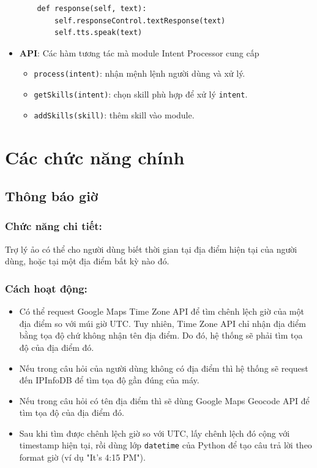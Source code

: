 \begin{itemize}
\begin{lstlisting}
    def response(self, text):
        self.responseControl.textResponse(text)
        self.tts.speak(text)
\end{lstlisting}
\item \textbf{API}: Các hàm tương tác mà module Intent Processor cung cấp
\begin{itemize}
\item \lstinline{process(intent)}: nhận mệnh lệnh người dùng và xử lý.
\item \lstinline{getSkills(intent)}: chọn skill phù hợp để xử lý \lstinline{intent}.
\item \lstinline{addSkills(skill)}: thêm skill vào module.
\end{itemize}
\end{itemize}

\section{Các chức năng chính}

\subsection{Thông báo giờ}

\subsubsection{Chức năng chi tiết:}

Trợ lý ảo có thể cho người dùng biết thời gian tại địa điểm hiện tại của người dùng, hoặc tại một địa điểm bất kỳ nào đó.

\subsubsection{Cách hoạt động:}

\begin{itemize}
    \item Có thể request Google Maps Time Zone API để tìm chênh lệch giờ của một địa điểm so với múi giờ UTC. Tuy nhiên, Time Zone API chỉ nhận địa điểm bằng tọa độ chứ không nhận tên địa điểm. Do đó, hệ thống sẽ phải tìm tọa độ của địa điểm đó.
    \item Nếu trong câu hỏi của người dùng không có địa điểm thì hệ thống sẽ request đến IPInfoDB để tìm tọa độ gần đúng của máy.
    \item Nếu trong câu hỏi có tên địa điểm thì sẽ dùng Google Maps Geocode API để tìm tọa độ của địa điểm đó.
    \item Sau khi tìm được chênh lệch giờ so với UTC, lấy chênh lệch đó cộng với timestamp hiện tại, rồi dùng lớp \lstinline{datetime} của Python để tạo câu trả lời theo format giờ (ví dụ "It's 4:15 PM").
\end{itemize}

